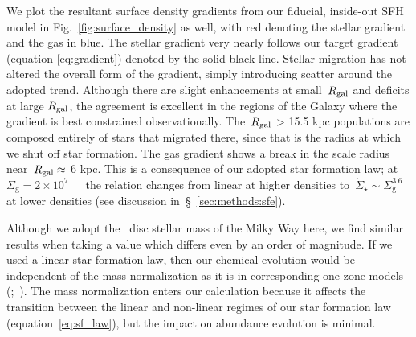 \documentclass[draft2.tex]{subfiles}
\begin{document}
We plot the resultant surface density gradients from our fiducial, inside-out 
SFH model in Fig.~\ref{fig:surface_density} as well, with red denoting the 
stellar gradient and the gas in blue. 
The stellar gradient very nearly follows our target gradient (equation 
\ref{eq:gradient}) denoted by the solid black line. 
Stellar migration has not altered the overall form of the gradient, simply 
introducing scatter around the adopted trend. 
Although there are slight enhancements at small~$R_\text{gal}$ and deficits at large 
$R_\text{gal}$, the agreement is excellent in the regions of the Galaxy where the 
gradient is best constrained observationally. 
The~$R_\text{gal}$ > 15.5 kpc populations are composed entirely of stars that 
migrated there, since that is the radius at which we shut off star formation. 
The gas gradient shows a break in the scale radius near~$R_\text{gal} \approx$ 
6 kpc. This is a consequence of our adopted star formation law; at 
$\Sigma_\text{g} = 2\times10^7$~\msun~\persqkpc~the relation changes from 
linear at higher densities to~$\dot{\Sigma}_\star \sim \Sigma_\text{g}^{3.6}$ 
at lower densities (see discussion in~\S~\ref{sec:methods:sfe}). 
\par 
Although we adopt the~\citet{Licquia2015} disc stellar mass of the Milky Way 
here, we find similar results when taking a value which differs even by an 
order of magnitude. 
If we used a linear star formation law, then our chemical evolution would be 
independent of the mass normalization as it is in corresponding one-zone 
models (\citealp*{Spitoni2017};~\citealp{Weinberg2017, Belfiore2019}). 
The mass normalization enters our calculation because it affects the transition 
between the linear and non-linear regimes of our star formation law 
(equation~\ref{eq:sf_law}), but the impact on abundance evolution is minimal. 
\end{document}
